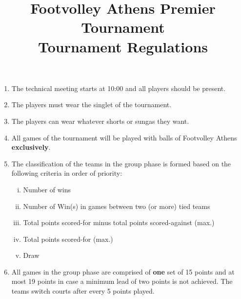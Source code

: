 \documentclass[a4paper,11pt]{article}
\title{Footvolley Athens Premier Tournament \\ Tournament Regulations}
\date{}
\begin{document}
\maketitle
\thispagestyle{fancy}

\vspace{-3cm}

\begin{enumerate}

\item The technical meeting starts at 10:00 and all players should be present.

\item The players must wear the singlet of the tournament.

\item The players can wear whatever shorts or sungas they want.

\item All games of the tournament will be played with balls of Footvolley Athens
  \textbf{exclusively}.




\item The classification of the teams in the group phase is formed based on the
  following criteria in order of priority:

  \begin{enumerate}[i)]
  \item Number of wins
  \item Number of Win(s) in games between two (or more) tied teams
  \item Total points scored-for minus total points scored-against (max.)
  \item Total points scored-for (max.)
  \item Draw %
  \end{enumerate}

\item All games in the group phase are comprised of \textbf{one} set of 15
  points and at most 19 points in case a minimum lead of two points is not
  achieved. The teams switch courts after every 5 points played.


\end{enumerate}
\end{document}
